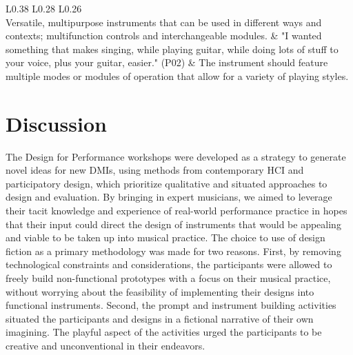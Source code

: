 \documentclass[letterpaper, 12pt]{article}
\begin{document}
\begin{table}[t]
\begin{tabular}{L{0.38\textwidth} L{0.28\textwidth} L{0.26\textwidth}}
         \\
        Versatile, multipurpose instruments that can be used in different ways and contexts; multifunction controls and interchangeable modules. &
        "I wanted something that makes singing, while playing guitar, while doing lots of stuff to your voice, plus your guitar, easier." (P02) &
        The instrument should feature multiple modes or modules of operation that allow for a variety of playing styles. \\
        \hline
        
    \end{tabular}
    \label{tab:themes-and-specs}
\end{table}


\section{Discussion}
\label{ch3-sec:discussion}

The Design for Performance workshops were developed as a strategy to generate novel ideas for new DMIs, using methods from contemporary HCI and participatory design, which prioritize qualitative and situated approaches to design and evaluation. By bringing in expert musicians, we aimed to leverage their tacit knowledge and experience of real-world performance practice in hopes that their input could direct the design of instruments that would be appealing and viable to be taken up into musical practice. The choice to use of design fiction as a primary methodology was made for two reasons. First, by removing technological constraints and considerations, the participants were allowed to freely build non-functional prototypes with a focus on their musical practice, without worrying about the feasibility of implementing their designs into functional instruments. Second, the prompt and instrument building activities situated the participants and designs in a fictional narrative of their own imagining. The playful aspect of the activities urged the participants to be creative and unconventional in their endeavors. 
\end{document}
